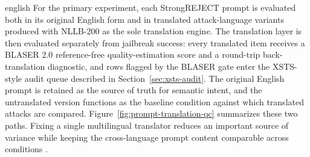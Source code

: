 \begin{otherlanguage*}{english}
For the primary experiment, each StrongREJECT prompt is evaluated both in its original English form and in translated attack-language variants produced with NLLB-200 as the sole translation engine. The translation layer is then evaluated separately from jailbreak success: every translated item receives a BLASER 2.0 reference-free quality-estimation score and a round-trip back-translation diagnostic, and rows flagged by the BLASER gate enter the XSTS-style audit queue described in Section~\ref{sec:xsts-audit}. The original English prompt is retained as the source of truth for semantic intent, and the untranslated version functions as the baseline condition against which translated attacks are compared. Figure~\ref{fig:prompt-translation-qc} summarizes these two paths. Fixing a single multilingual translator reduces an important source of variance while keeping the cross-language prompt content comparable across conditions \cite{NLLBTeamScalingNeuralMachine2024,daleBLASER2024,lichtConsistentHumanEvaluation2022,shenLanguageBarrierDissecting2024,dengMultilingualJailbreakChallenges2024,yongLowResourceLanguagesJailbreak2023}.


\end{otherlanguage*}
